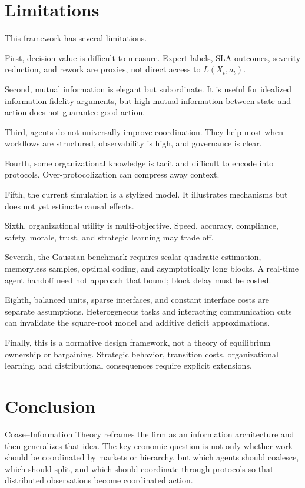 \documentclass[11pt]{article}
\begin{document}
\section{Limitations}

This framework has several limitations.

First, decision value is difficult to measure. Expert labels, SLA outcomes,
severity reduction, and rework are proxies, not direct access to
\(L(X_t,a_t)\).

Second, mutual information is elegant but subordinate. It is useful for
idealized information-fidelity arguments, but high mutual information between
state and action does not guarantee good action.

Third, agents do not universally improve coordination. They help most when
workflows are structured, observability is high, and governance is clear.

Fourth, some organizational knowledge is tacit and difficult to encode into
protocols. Over-protocolization can compress away context.

Fifth, the current simulation is a stylized model. It illustrates mechanisms but
does not yet estimate causal effects.

Sixth, organizational utility is multi-objective. Speed, accuracy, compliance,
safety, morale, trust, and strategic learning may trade off.

Seventh, the Gaussian benchmark requires scalar quadratic estimation,
memoryless samples, optimal coding, and asymptotically long blocks. A real-time
agent handoff need not approach that bound; block delay must be costed.

Eighth, balanced units, sparse interfaces, and constant interface costs are
separate assumptions. Heterogeneous tasks and interacting communication cuts
can invalidate the square-root model and additive deficit approximations.

Finally, this is a normative design framework, not a theory of equilibrium
ownership or bargaining. Strategic behavior, transition costs, organizational
learning, and distributional consequences require explicit extensions.

\section{Conclusion}

Coase--Information Theory reframes the firm as an information architecture and
then generalizes that idea. The key economic question is not only whether work
should be coordinated by markets or hierarchy, but which agents should
coalesce, which should split, and which should coordinate through protocols so
that distributed observations become coordinated action.
\end{document}
